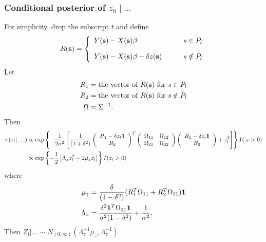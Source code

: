 \subsubsection*{Conditional posterior of $z_{tl} \mid \ldots $}\label{s:mvcondu}
For simplicity, drop the subscript $t$ and define 
\begin{align*}
R(\mbox{\bf s}) = \left\{ 
    \begin{array}{ll}
        Y(\mbox{\bf s}) - X(\mbox{\bf s}) \beta &s \in P_l\\[1em]
        Y(\mbox{\bf s}) - X(\mbox{\bf s}) \beta - \delta z(\mbox{\bf s}) \qquad & s \notin P_l
    \end{array} 
\right.
\end{align*}
Let 
\begin{align*}
    R_1 &= \text{the vector of } R(\mbox{\bf s}) \text{ for } s \in P_l \\
    R_2 &= \text{the vector of } R(\mbox{\bf s}) \text{ for } s \notin P_l \\
    \Omega &= \Sigma^{-1}.
\end{align*}
Then
\begin{align*}
    \pi(z_l | \ldots) &\propto \exp \left\{ -\frac{ 1 }{ 2 \sigma^2 } \left[ \frac{ 1 }{ (1 + \delta^2)}
        \left( \begin{array}{c}
            R_1 - \delta z_l \mbox{\boldmath $1$}\\
            R_2
        \end{array} \right)^T
        \left( \begin{array}{cc}
            \Omega_{11} & \Omega_{12}\\
            \Omega_{21} & \Omega_{22}
        \end{array} \right)
        \left( \begin{array}{c}
            R_1 - \delta z_l \mbox{\boldmath $1$}\\
            R_2
        \end{array} \right)
        +  z_l^2 \right]
    \right\} I(z_l > 0) \\
        &\propto \exp \left\{ -\frac{ 1 }{ 2 } \left[ \Lambda_z z_l^2 - 2 \mu_z z_l \right] \right\} I(z_l > 0)
\end{align*}
where
\begin{align*}
    \mu_z &= \frac{ \delta}{(1 - \delta^2)} ( R_1^T \Omega_{11} + R_2^T \Omega_{21} )\mbox{\boldmath $1$}\\
    \Lambda_z &= \frac{\delta^2 \mbox{\boldmath $1$}^T \Omega_{11} \mbox{\boldmath $1$} }{ \sigma^2 (1 - \delta^2) } + \frac{ 1 }{ \sigma^2 }.
\end{align*}
Then $Z_l | \ldots \sim N_{(0, \infty)} (\Lambda_z^{-1} \mu_z, \Lambda_z^{-1})$